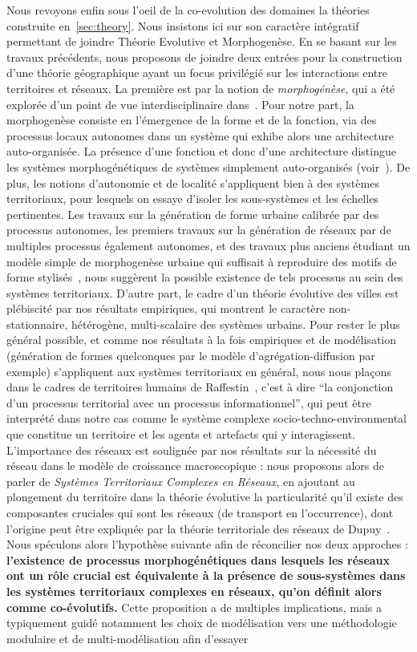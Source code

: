 Nous revoyons enfin sous l'oeil de la co-evolution des domaines la théories construite en~\ref{sec:theory}. Nous insistons ici sur son caractère intégratif permettant de joindre Théorie Evolutive et Morphogenèse. En se basant sur les travaux précédents, nous proposons de joindre deux entrées pour la construction d'une théorie géographique ayant un focus privilégié sur les interactions entre territoires et réseaux. La première est par la notion de \emph{morphogénèse}, qui a été explorée d'un point de vue interdisciplinaire dans~\cite{antelope2016interdisciplinary}. Pour notre part, la morphogenèse consiste en l'émergence de la forme et de la fonction, via des processus locaux autonomes dans un système qui exhibe alors une architecture auto-organisée. La présence d'une fonction et donc d'une architecture distingue les systèmes morphogénétiques de systèmes simplement auto-organisés (voir~\cite{doursat2012morphogenetic}). De plus, les notions d'autonomie et de localité s'appliquent bien à des systèmes territoriaux, pour lesquels on essaye d'isoler les sous-systèmes et les échelles pertinentes. Les travaux sur la génération de forme urbaine calibrée par des processus autonomes, les premiers travaux sur la génération de réseaux par de multiples processus également autonomes, et des travaux plus anciens étudiant un modèle simple de morphogenèse urbaine qui suffisait à reproduire des motifs de forme stylisés~\cite{raimbault2014hybrid}, nous suggèrent la possible existence de tels processus au sein des systèmes territoriaux. D'autre part, le cadre d'un théorie évolutive des villes est plébiscité par nos résultats empiriques, qui montrent le caractère non-stationnaire, hétérogène, multi-scalaire des systèmes urbains. Pour rester le plus général possible, et comme nos résultats à la fois empiriques et de modélisation (génération de formes quelconques par le modèle d'agrégation-diffusion par exemple) s'appliquent aux systèmes territoriaux en général, nous nous plaçons dans le cadres de territoires humains de Raffestin~\cite{raffestin1988reperes}, c'est à dire ``la conjonction d'un processus territorial avec un processus informationnel'', qui peut être interprété dans notre cas comme le système complexe socio-techno-environmental que constitue un territoire et les agents et artefacts qui y interagissent. L'importance des réseaux est soulignée par nos résultats sur la nécessité du réseau dans le modèle de croissance macroscopique : nous proposons alors de parler de \emph{Systèmes Territoriaux Complexes en Réseaux}, en ajoutant au plongement du territoire dans la théorie évolutive la particularité qu'il existe des composantes cruciales qui sont les réseaux (de transport en l'occurrence), dont l'origine peut être expliquée par la théorie territoriale des réseaux de Dupuy~\cite{dupuy1987vers}. Nous spéculons alors l'hypothèse suivante afin de réconcilier nos deux approches : \textbf{l'existence de processus morphogénétiques dans lesquels les réseaux ont un rôle crucial est équivalente à la présence de sous-systèmes dans les systèmes territoriaux complexes en réseaux, qu'on définit alors comme co-évolutifs.} Cette proposition a de multiples implications, mais a typiquement guidé notamment les choix de modélisation vers une méthodologie modulaire et de multi-modélisation afin d'essayer 